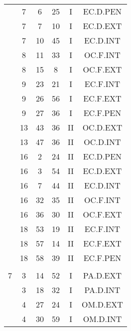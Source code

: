 \documentclass[12pt, a4paper]{article}
\begin{document}
\begin{multicols}{3}
{\begin{tabular}{c c c c c c}
	 	 	 	 & 7 & 6 & 25 & I & EC.D.PEN\\%
	 	 	 	 & 7 & 7 & 10 & I & EC.D.EXT\\%
	 	 	 	 & 7 & 10 & 45 & I & EC.D.INT\\%
	 	 	 	 & 8 & 11 & 33 & I & OC.F.INT\\%
	 	 	 	 & 8 & 15 & 8 & I & OC.F.EXT\\%
	 	 	 	 & 9 & 23 & 21 & I & EC.F.INT\\%
	 	 	 	 & 9 & 26 & 56 & I & EC.F.EXT\\%
	 	 	 	 & 9 & 27 & 36 & I & EC.F.PEN\\%
	 	 	 	 & 13 & 43 & 36 & II & OC.D.EXT\\%
	 	 	 	 & 13 & 47 & 36 & II & OC.D.INT\\%
	 	 	 	 & 16 & 2 & 24 & II & EC.D.PEN\\%
	 	 	 	 & 16 & 3 & 54 & II & EC.D.EXT\\%
	 	 	 	 & 16 & 7 & 44 & II & EC.D.INT\\%
	 	 	 	 & 16 & 32 & 35 & II & OC.F.INT\\%
	 	 	 	 & 16 & 36 & 30 & II & OC.F.EXT\\%
	 	 	 	 & 18 & 53 & 19 & II & EC.F.INT\\%
	 	 	 	 & 18 & 57 & 14 & II & EC.F.EXT\\%
	 	 	 	 & 18 & 58 & 39 & II & EC.F.PEN\\%
	 	 	 	 & & & & & \\%
	 	 	 	7 & 3 & 14 & 52 & I & PA.D.EXT\\%
	 	 	 	 & 3 & 18 & 32 & I & PA.D.INT\\%
	 	 	 	 & 4 & 27 & 24 & I & OM.D.EXT\\%
	 	 	 	 & 4 & 30 & 59 & I & OM.D.INT\\%

\end{tabular}}
\end{multicols}
\end{document}
